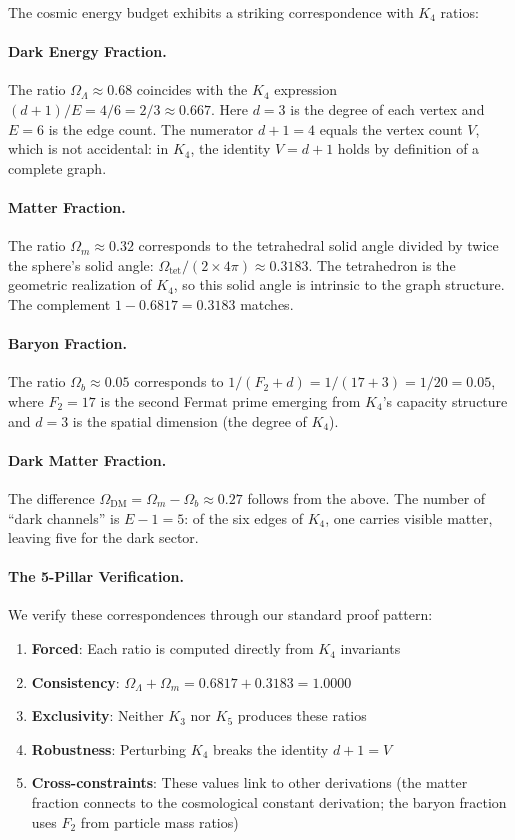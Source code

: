 \documentclass[11pt,a4paper]{book}
\begin{document}
The cosmic energy budget exhibits a striking correspondence with $K_4$ ratios:

\paragraph{Dark Energy Fraction.}
The ratio $\Omega_\Lambda \approx 0.68$ coincides with the $K_4$ expression $(d+1)/E = 4/6 = 2/3 \approx 0.667$.
Here $d = 3$ is the degree of each vertex and $E = 6$ is the edge count.
The numerator $d + 1 = 4$ equals the vertex count $V$, which is not accidental:
in $K_4$, the identity $V = d + 1$ holds by definition of a complete graph.

\paragraph{Matter Fraction.}
The ratio $\Omega_m \approx 0.32$ corresponds to the tetrahedral solid angle divided by twice 
the sphere's solid angle: $\Omega_{\text{tet}}/(2 \times 4\pi) \approx 0.3183$.
The tetrahedron is the geometric realization of $K_4$, so this solid angle is 
intrinsic to the graph structure. The complement $1 - 0.6817 = 0.3183$ matches.

\paragraph{Baryon Fraction.}
The ratio $\Omega_b \approx 0.05$ corresponds to $1/(F_2 + d) = 1/(17 + 3) = 1/20 = 0.05$,
where $F_2 = 17$ is the second Fermat prime emerging from $K_4$'s capacity structure
and $d = 3$ is the spatial dimension (the degree of $K_4$).

\paragraph{Dark Matter Fraction.}
The difference $\Omega_{\text{DM}} = \Omega_m - \Omega_b \approx 0.27$ follows from the above.
The number of ``dark channels'' is $E - 1 = 5$: of the six edges of $K_4$, one carries
visible matter, leaving five for the dark sector.

\paragraph{The 5-Pillar Verification.}
We verify these correspondences through our standard proof pattern:
\begin{enumerate}
\item \textbf{Forced}: Each ratio is computed directly from $K_4$ invariants
\item \textbf{Consistency}: $\Omega_\Lambda + \Omega_m = 0.6817 + 0.3183 = 1.0000$
\item \textbf{Exclusivity}: Neither $K_3$ nor $K_5$ produces these ratios
\item \textbf{Robustness}: Perturbing $K_4$ breaks the identity $d + 1 = V$
\item \textbf{Cross-constraints}: These values link to other derivations 
      (the matter fraction connects to the cosmological constant derivation;
       the baryon fraction uses $F_2$ from particle mass ratios)
\end{enumerate}
\end{document}
